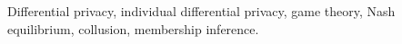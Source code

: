 \documentclass[conference]{IEEEtran}
\theoremstyle{plain}
\theoremstyle{definition}
\theoremstyle{remark}
\begin{document}
\begin{IEEEkeywords}
Differential privacy, individual differential privacy, game theory,
Nash equilibrium, collusion, membership inference.
\end{IEEEkeywords}














\end{document}
